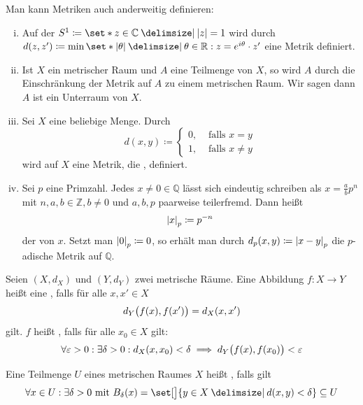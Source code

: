 \begin{beispiel}[{name=[Metriken verschiedenster Art]}]
	Man kann Metriken auch anderweitig definieren:
	\begin{enumerate}[(i)]
		\item Auf der  \(
			S^1 \coloneqq \set*{z \in \mathbb{C} \given \abs*{z} = 1}
		\)
		wird durch $d(z,z') \coloneqq \min \set*{\abs*{\theta} \given \theta \in \mathbb{R} : z = e^{i \theta} \cdot z'} $ eine Metrik definiert.
		\item Ist $X$ ein metrischer Raum und $A$ eine Teilmenge von $X$, so wird $A$ durch die Einschränkung der Metrik auf $A$ zu einem metrischen Raum.
		Wir sagen dann $A$ ist ein Unterraum von $X$.
		\item Sei $X$ eine beliebige Menge. Durch
		\[
			d(x,y) \coloneqq \begin{cases}
				0, &\text{ falls } x=y\\
				1, &\text{ falls } x \neq y
			\end{cases}
		\]
		wird auf $X$ eine Metrik, die , definiert.
		\item Sei $p$ eine Primzahl.
		Jedes $x \neq 0 \in \mathbb{Q}$ lässt sich eindeutig schreiben als $x = \frac{a}{b} p^n$ mit $n,a,b \in \mathbb{Z}, b \neq 0$ und $a,b,p$ paarweise teilerfremd.
		Dann heißt
		\[
			\abs*{x}_p \coloneqq p^{-n}
		\]
		der  von $x$.
		Setzt man $\abs*{0}_p \coloneqq 0 $, so erhält man durch $d_p(x,y) \coloneqq \abs*{x-y}_p $ die $p$-adische Metrik auf $\mathbb{Q}$.
	\end{enumerate}
\end{beispiel}

\begin{definition}[{name=[Isometrie und Stetigkeit]}]
	Seien $(X,d_X)$ und $(Y,d_Y)$ zwei metrische Räume.
	Eine Abbildung $f \colon X \to Y$ heißt eine , falls für alle $x,x' \in X$
	\[
		d_Y \enbrace[\big]{f(x), f(x')} = d_X (x,x')
	\]
	gilt.
	$f$ heißt , falls für alle $x_0 \in X$ gilt:
	\[
		\forall \varepsilon >0 : \exists \delta >0 : d_X(x,x_0) < \delta  \implies d_Y \enbrace[\big]{f(x), f(x_0)} < \varepsilon
	\]
\end{definition}

\begin{definition}[{name=[Offene Mengen in metrischen Räumen]},label=def:offen-metrisch]
	Eine Teilmenge $U$ eines metrischen Raumes $X$ heißt , falls gilt
	\[
		\forall x \in U : \exists \delta  > 0 \text{ mit } B_\delta (x) = \set[\big]{y \in X \given d(x,y) < \delta } \subseteq U
	\]
\end{definition}

